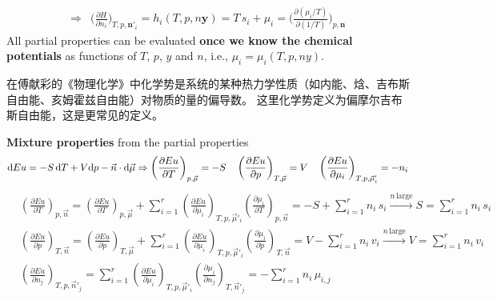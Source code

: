 \begin{thm}
\begin{align*}
        \Rightarrow&\Big(\frac{\partial H}{\partial n_i}\Big)_{T,p,\boldsymbol{n}'_i} = h_i(T,p,n\boldsymbol{y}) 
        = T \, s_i + \mu_i = \Big(\frac{\partial(\mu_i/T)}{\partial(1/T)}\Big)_{p,\boldsymbol{n}} 
    \end{align*}
    All partial properties can be evaluated \textbf{once we know 
    the chemical potentials} as functions of \( T \), \( p \), \( y \) and \( n \), 
    i.e., \( \mu_i = \mu_i(T, p, ny) \).
    \begin{zhu}
        在傅献彩的《物理化学》中化学势是系统的某种热力学性质（如内能、焓、吉布斯自由能、亥姆霍兹自由能）对物质的量的偏导数。
        \textcolor{b1}{这里化学势定义为偏摩尔吉布斯自由能，这是更常见的定义。}
    \end{zhu}
\end{thm}
\begin{thm}
    \textbf{Mixture properties} from the partial properties
    \begin{equation*}
        {\rm d}Eu = -S\,{\rm d}T + V{\rm d}p - \vec{n} \cdot {\rm d}\vec{\mu} \Rightarrow 
        \left(\frac{\partial Eu}{\partial T}\right)_{p,\vec{\mu}} = -S \quad
        \left(\frac{\partial Eu}{\partial p}\right)_{T,\vec{\mu}} = V \quad
        \left(\frac{\partial Eu}{\partial \mu_i}\right)_{T,p,\vec{\mu}'_i} = -n_i
    \end{equation*}
    \begin{align*}
        &\left(\frac{\partial E u}{\partial T}\right)_{p,\vec{n}} = 
        \left(\frac{\partial E u}{\partial T}\right)_{p,\vec{\mu}} + 
        \sum_{i=1}^r \left(\frac{\partial E u}{\partial \mu_i}\right)_{T,p,\vec{\mu}'_i} 
        \left(\frac{\partial \mu_i}{\partial T}\right)_{p,\vec{n}} = -S + \sum_{i=1}^r n_i \, s_i
        \xrightarrow{n \, \text{large}} S = \sum_{i=1}^r n_i \, s_i \\
        &\left(\frac{\partial E u}{\partial p}\right)_{T,\vec{n}} = 
        \left(\frac{\partial E u}{\partial p}\right)_{T,\vec{\mu}} + 
        \sum_{i=1}^r \left(\frac{\partial E u}{\partial \mu_i}\right)_{T,p,\vec{\mu}'_i} 
        \left(\frac{\partial \mu_i}{\partial p}\right)_{T,\vec{n}} = V - \sum_{i=1}^r n_i \, v_i
        \xrightarrow{n \, \text{large}} V = \sum_{i=1}^r n_i \, v_i \\
        &\left(\frac{\partial E u}{\partial n_j}\right)_{T,p,\vec{n}'_j} = 
        \sum_{i=1}^r \left(\frac{\partial E u}{\partial \mu_i}\right)_{T,p,\vec{\mu}'_i} 
        \left(\frac{\partial \mu_i}{\partial n_j}\right)_{T,\vec{n}'_j} = -\sum_{i=1}^r n_i \, \mu_{i,j}\\

\end{align*}
\end{thm}
